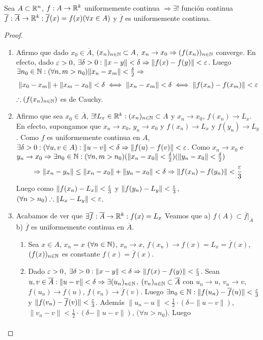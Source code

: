 \clearpage

\begin{theorem}
  Sea $A \subset \mathbb{R}^n$, $f: A \to \mathbb{R}^k$ uniformemente continua $\Rightarrow \exists !$ función continua $\overline{f}: \overline{A} \to \mathbb{R}^k : \overline{f}(x) = f(x) (\forall x \in A)$ y $\overline{f}$ es uniformemente continua.
  \begin{proof}
    \begin{enumerate}
      \item Afirmo que dado $x_0 \in \overline{A}$, $(x_n)_{n \in \mathbb{N}} \subset A$, $x_n \to x_0 \Rightarrow (f(x_n))_{n \in \mathbb{N}}$ converge. En efecto, dado $\varepsilon > 0$, $\exists \delta > 0 : \|x-y\| < \delta \Rightarrow \|f(x) - f(y)\| < \varepsilon$. Luego $\exists n_0 \in \mathbb{N} : (\forall n, m > n_0) \|x_n - x_m\| < \frac{\delta}{2} \Rightarrow$ \begin{align*}
              \|x_0 - x_m\| + \|x_m - x_0\| < \delta \iff \|x_n - x_m\| < \delta \iff \|f(x_n) - f(x_m)\| < \varepsilon
            \end{align*} $\therefore (f(x_n)_{n \in \mathbb{N}})$ es de Cauchy.
      \item Afirmo que sea $x_0 \in \overline{A}$, $\exists ! L_x \in \mathbb{R}^k : (x_n)_{n \in \mathbb{N}} \subset A$ y $x_n \to x_0$, $f(x_n) \to L_x$. En efecto, supongamos que $x_n \to x_0$, $y_n \to x_0$ y $f(x_n) \to L_x$ y $f(y_n) \to L_y$. Como $f$ es uniformemente continua en $A$, $\exists \delta > 0 : (\forall u, v \in A) : \|u-v\| < \delta \Rightarrow \|f(u) - f(v)\| < \varepsilon$. Como $x_n \to x_0$ e $y_n \to x_0 \Rightarrow \exists n_0 \in \mathbb{N} : (\forall n, m > n_0) (\|x_n - x_0\| < \frac{\delta}{2}) (\| y_n - x_0 \| < \frac{\delta}{2})$ \begin{align*}
              \Rightarrow \|x_n - y_n\| \leq \|x_n - x_0\| + \|y_n - x_0\| < \delta \Rightarrow \|f(x_n) - f(y_n)\| < \frac{\varepsilon}{3}
            \end{align*} Luego como $\|f(x_n) - L_x\| < \frac{\varepsilon}{3}$ y $\|f(y_n) - L_y\| < \frac{\varepsilon}{3}$, $(\forall n > n_0) \therefore \|L_x - L_y\| < \varepsilon$.
      \item Acabamos de ver que $\exists \overline{f}: \overline{A} \to \mathbb{R}^k : f(x) = L_x$ Veamos que a) $f(A) \subset \overline{f}|_A$ b) $\overline{f}$ es uniformemente continua en $\overline{A}$. \begin{enumerate}
              \item Sea $x \in A$, $x_n = x$ $(\forall n \in \mathbb{N})$, $x_n \to x$, $f(x_n) \to f(x) = L_x = \overline{f}(x)$, $(f(x))_{n \in \mathbb{N}}$ es constante $f(x) = \overline{f}(x)$.
              \item Dado $\varepsilon > 0$, $\exists \delta > 0 : \|x-y\| < \delta \Rightarrow \|f(x) - f(y)\| < \frac{\varepsilon}{3}$. Sean $u, v \in \overline{A} : \|u - v\| < \delta \Rightarrow \exists (u_n)_{n \in \mathbb{N}}$, $(v_n)_{n \in \mathbb{N}} \subset \overline{A}$ con $u_n \to u$, $v_n \to v$, $f(u_n) \to \overline{f}(u)$, $f(v_n) \to \overline{f}(v)$. Luego $\exists n_0 \in \mathbb{N} : \|f(u_n) - \overline{f}(u)\| < \frac{\varepsilon}{3}$ y $\|f(v_n) - \overline{f}(v)\| < \frac{\varepsilon}{3}$. Además $\|u_n - u\| < \frac{1}{2} \cdot (\delta - \|u - v\|)$, $\|v_n - v\| < \frac{1}{2} \cdot (\delta - \|u - v\|)$, $(\forall n > n_0$). Luego \begin{align*}

\end{align*}
\end{enumerate}
\end{enumerate}
\end{proof}
\end{theorem}

